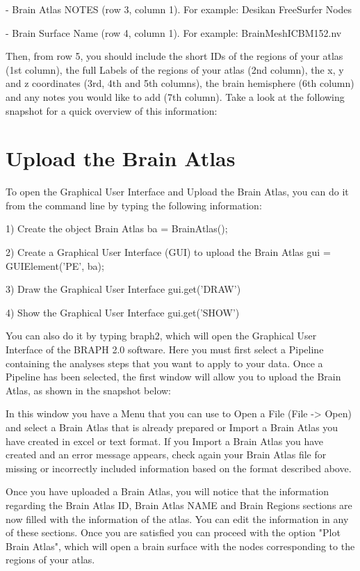 \documentclass{tufte-handout}
\begin{document}
- Brain Atlas NOTES (row 3, column 1).
For example: Desikan FreeSurfer Nodes


- Brain Surface Name (row 4, column 1).
For example: BrainMeshICBM152.nv


Then, from row 5, you should include the short IDs of the regions of your atlas (1st column), the full Labels of the  regions of your atlas (2nd column), the x, y and z coordinates (3rd, 4th and 5th columns), the brain hemisphere (6th column) and any notes you would like to add (7th column). Take a look at the following snapshot for a quick overview of this information:


\section{Upload the Brain Atlas}

To open the Graphical User Interface and Upload the Brain Atlas, you can do it from the command line by typing the following information:


1) Create the object Brain Atlas
ba = BrainAtlas();


2) Create a Graphical User Interface (GUI) to upload the Brain Atlas
gui = GUIElement('PE', ba);


3) Draw the Graphical User Interface
gui.get('DRAW')


4) Show  the Graphical User Interface
gui.get('SHOW')


You can also do it by typing braph2, which will open the Graphical User Interface of the BRAPH 2.0 software. Here you must first select a Pipeline containing the analyses steps that you want to apply to your data. Once a Pipeline has been selected, the first window will allow you to upload the Brain Atlas, as shown in the snapshot below:

 
In this window you have a Menu that you can use to Open a File (File -> Open) and select a Brain Atlas that is already prepared or Import a Brain Atlas you have created in excel or text format. If you Import a Brain Atlas you have created and an error message appears, check again your Brain Atlas file for missing or incorrectly included information based on the format described above.


Once you have uploaded a Brain Atlas, you will notice that the information regarding the Brain Atlas ID, Brain Atlas NAME and Brain Regions sections are now filled with the information of the atlas. You can edit the information in any of these sections. Once you are satisfied you can proceed with the option "Plot Brain Atlas", which will open a brain surface with the nodes corresponding to the regions of your atlas.
\end{document}
